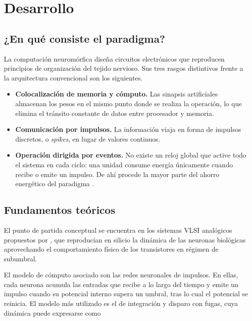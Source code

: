 \documentclass[a4paper,11pt,oneside]{book}
\begin{document}
\clearpage
\chapter{Desarrollo}
\label{cap:desarrollo}

\section{¿En qué consiste el paradigma?}

La computación neuromórfica diseña circuitos electrónicos que reproducen
principios de organización del tejido nervioso. Sus tres rasgos distintivos
frente a la arquitectura convencional son los siguientes.

\begin{itemize}
  \item \textbf{Colocalización de memoria y cómputo.} Las sinapsis artificiales
  almacenan los pesos en el mismo punto donde se realiza la operación, lo que
  elimina el tránsito constante de datos entre procesador y memoria.
  \item \textbf{Comunicación por impulsos.} La información viaja en forma de
  impulsos discretos, o \emph{spikes}, en lugar de valores continuos.
  \item \textbf{Operación dirigida por eventos.} No existe un reloj global que
  active todo el sistema en cada ciclo: una unidad consume energía únicamente
  cuando recibe o emite un impulso. De ahí procede la mayor parte del ahorro
  energético del paradigma \parencite{indiveri2015}.
\end{itemize}

\section{Fundamentos teóricos}

El punto de partida conceptual se encuentra en los sistemas VLSI analógicos
propuestos por \textcite{mead1990}, que reproducían en silicio la dinámica de las
neuronas biológicas aprovechando el comportamiento físico de los transistores en
régimen de subumbral.

El modelo de cómputo asociado son las redes neuronales de impulsos. En ellas, cada
neurona acumula las entradas que recibe a lo largo del tiempo y emite un impulso
cuando su potencial interno supera un umbral, tras lo cual el potencial se
reinicia. El modelo más utilizado es el de integración y disparo con fugas, cuya
dinámica puede expresarse como
\end{document}
